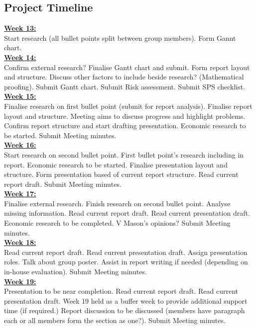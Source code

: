 \documentclass[12pt]{article}
\begin{document}
\subsection{Project Timeline}
\label{Project Timeline}

\textbf{\underline{Week 13:}} \\ [0.2cm]
Start research (all bullet points split between group members). Form Gannt chart. \\

\textbf{\underline{Week 14:}} \\ [0.2cm]
Confirm external research? Finalise Gantt chart and submit. Form report layout and structure. Discuss other factors to include beside research? (Mathematical proofing). Submit Gantt chart. Submit Risk assessment. Submit SPS checklist. \\

\textbf{\underline{Week 15:}} \\ [0.2cm]
Finalise research on first bullet point (submit for report analysis). Finalise report layout and structure.  Meeting aims to discuss progress and highlight problems. Confirm report structure and start drafting presentation. Economic research to be started. Submit Meeting minutes. \\

\textbf{\underline{Week 16:}} \\ [0.2cm]
Start research on second bullet point. First bullet point’s research including in report. Economic research to be started. Finalise presentation layout and structure. Form presentation based of current report structure. Read current report draft. Submit Meeting minutes. \\

\textbf{\underline{Week 17:}} \\ [0.2cm]
Finalise external research. Finish research on second bullet point. Analyse missing information. Read current report draft. Read current presentation draft. Economic research to be completed. V Mason’s opinions? Submit Meeting minutes.\\

\textbf{\underline{Week 18:}} \\ [0.2cm]
Read current report draft. Read current presentation draft. Assign presentation roles. Talk about group poster. Assist in report writing if needed (depending on in-house evaluation).
Submit Meeting minutes. \\

\textbf{\underline{Week 19:}} \\ [0.2cm]
Presentation to be near completion. Read current report draft. Read current presentation draft. Week 19 held as a buffer week to provide additional support time (if required.) Report discussion to be discussed (members have paragraph each or all members form the section as one?). Submit Meeting minutes. \\
\end{document}
